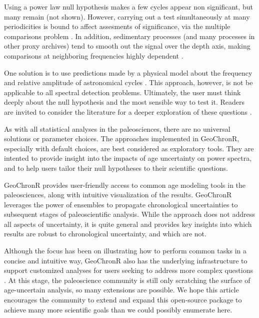 \documentclass[gchron, manuscript]{copernicus}
\begin{document}
Using a power law null hypothesis makes a few cycles appear non significant, but many remain (not shown).
However, carrying out a test simultaneously at many periodicities is bound to affect assesments of significance, via the multiple comparisons problem \citep{Vaughan_PP2011}. In addition, sedimentary processes (and many processes in other proxy archives) tend to smooth out the signal over the depth axis, making comparisons at neighboring frequencies highly dependent \citep{Meyers_2012}.

One solution is to use predictions made by a physical model about the frequency and relative amplitude of astronomical cycles \citep{MeyersSageman_2007}. This approach, however, is not be applicable to all spectral detection problems. Ultimately, the user must think deeply about the null hypothesis and the most sensible way to test it. Readers are invited to consider the literature for a deeper exploration of these questions \citep[e.g.,][]{Vaughan_PP2011, Meyers_2012, Meyers_2015, MeyersMalinverno2018}.

As with all statistical analyses in the paleosciences, there are no universal solutions or parameter choices.
The approaches implemented in GeoChronR, especially with default choices, are best considered as exploratory tools. They are intented to provide insight into the impacts of age uncertainty on power spectra, and to help users tailor their null hypotheses to their scientific questions.

\conclusions

GeoChronR provides user-friendly access to common age modeling tools in the paleosciences, along with intuitive visualization of the results. GeoChronR leverages the power of ensembles to propagate chronological uncertainties to subsequent stages of paleoscientific analysis. While the approach does not address all aspects of uncertainty, it is quite general and provides key insights into which results are robust to chronological uncertainty, and which are not.

Although the focus has been on illustrating how to perform common tasks in a concise and intuitive way, GeoChronR also has the underlying infrastructure to support customized analyses for users seeking to address more complex questions \citep[e.g.][]{thomas2018sikuiui}. At this stage, the paleoscience community is still only scratching the surface of age-uncertain analysis, so many extensions are possible. We hope this article encourages the community to extend and expand this open-source package to achieve many more scientific goals than we could possibly enumerate here.
\end{document}
